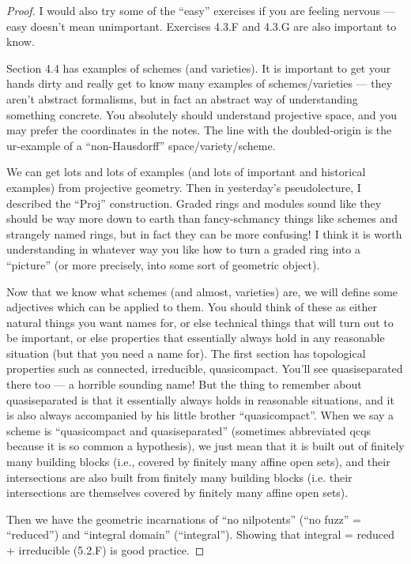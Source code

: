 \documentclass{book}
\theoremstyle{definition}
\begin{document}
\begin{proof}
I would also try some of the “easy” exercises if you are feeling nervous — easy doesn’t mean unimportant. Exercises 4.3.F and 4.3.G are also important to know.

Section 4.4 has examples of schemes (and varieties). It is important to get your hands dirty and really get to know many examples of schemes/varieties — they aren’t abstract formalisms, but in fact an abstract way of understanding something concrete. You absolutely should understand projective space, and you may prefer the coordinates in the notes. The line with the doubled-origin is the ur-example of a “non-Hausdorff” space/variety/scheme.

We can get lots and lots of examples (and lots of important and historical examples) from projective geometry. Then in yesterday’s pseudolecture, I described the “Proj” construction. Graded rings and modules sound like they should be way more down to earth than fancy-schmancy things like schemes and strangely named rings, but in fact they can be more confusing! I think it is worth understanding in whatever way you like how to turn a graded ring into a “picture” (or more precisely, into some sort of geometric object).

Now that we know what schemes (and almost, varieties) are, we will define some adjectives which can be applied to them. You should think of these as either natural things you want names for, or else technical things that will turn out to be important, or else properties that essentially always hold in any reasonable situation (but that you need a name for). The first section has topological properties such as connected, irreducible, quasicompact. You’ll see quasiseparated there too — a horrible sounding name! But the thing to remember about quasiseparated is that it essentially always holds in reasonable situations, and it is also always accompanied by his little brother “quasicompact”. When we say a scheme is “quasicompact and quasiseparated” (sometimes abbreviated qcqs because it is so common a hypothesis), we just mean that it is built out of finitely many building blocks (i.e., covered by finitely many affine open sets), and their intersections are also built from finitely many building blocks (i.e. their intersections are themselves covered by finitely many affine open sets).

Then we have the geometric incarnations of “no nilpotents” (“no fuzz” = “reduced”) and “integral domain” (“integral”). Showing that integral = reduced + irreducible (5.2.F) is good practice.


\end{proof}
\end{document}
